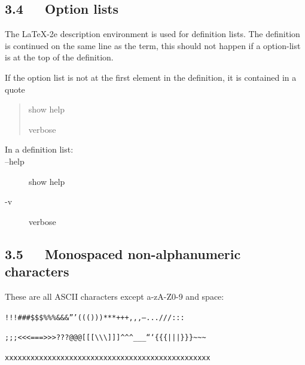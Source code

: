 \documentclass[a4paper]{article}
\providecommand*{\DUoptionlistlabel}[1]{\bf #1 \hfill}
\newenvironment{DUoptionlist}{%
    \list{}{\setlength{\labelwidth}{\DUoptionlistindent}
            \setlength{\rightmargin}{1cm}
            \setlength{\leftmargin}{\rightmargin}
            \addtolength{\leftmargin}{\labelwidth}
            \addtolength{\leftmargin}{\labelsep}
            \renewcommand{\makelabel}{\DUoptionlistlabel}}
  }
  {\endlist}
\begin{document}


\subsection{3.4   Option lists%
  \label{option-lists-1}%
}

The LaTeX-2e description environment is used for definition lists.
The definition is continued on the same line as the term, this should
not happen if a option-list is at the top of the definition.

If the option list is not at the first element in the definition, it
is contained in a quote

\begin{quote}
\begin{DUoptionlist}
\item[--help]  show help

\item[-v]  verbose
\end{DUoptionlist}
\end{quote}

\begin{description}
\item[{In a definition list:}] \leavevmode 
\begin{DUoptionlist}
\item[--help]  show help

\item[-v]  verbose
\end{DUoptionlist}

\end{description}


\subsection{3.5   Monospaced non-alphanumeric characters%
  \label{monospaced-non-alphanumeric-characters}%
}

These are all ASCII characters except a-zA-Z0-9 and space:

\texttt{!!!\textquotedbl{}\textquotedbl{}\textquotedbl{}\#\#\#\$\$\$\%\%\%\&\&\&'''((()))***+++,,,---...///:::}

\texttt{;;;<<<===>>>???@@@{[}{[}{[}\textbackslash{}\textbackslash{}\textbackslash{}{]}{]}{]}\textasciicircum{}\textasciicircum{}\textasciicircum{}\_\_\_```\{\{\{|||\}\}\}\textasciitilde{}\textasciitilde{}\textasciitilde{}}

\texttt{xxxxxxxxxxxxxxxxxxxxxxxxxxxxxxxxxxxxxxxxxxxxxxxx}
\end{document}
